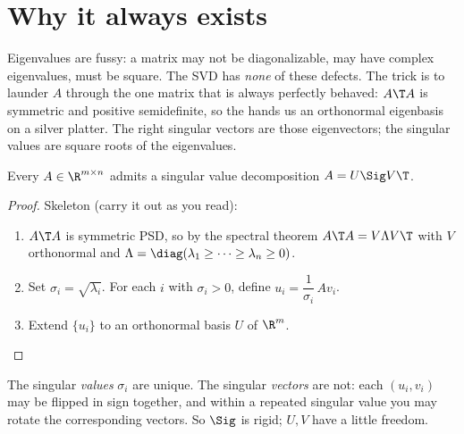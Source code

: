 \section{Why it always exists}\label{sec:existence}
\quad{}

\begin{strand}
Eigenvalues are fussy: a matrix may not be diagonalizable, may have complex eigenvalues, must
be square. The SVD has \emph{none} of these defects. The trick is to launder $A$ through the
one matrix that is always perfectly behaved: $A\T A$ is symmetric and positive semidefinite, so
the  hands us an orthonormal eigenbasis on a silver platter. The
right singular vectors are those eigenvectors; the singular values are square roots of the
eigenvalues.
\end{strand}


\begin{theorem}\label{thm:exist}
Every $A\in\R^{m\times n}$ admits a singular value decomposition $A=U\Sig V\T$.
\end{theorem}
\begin{proof}
Skeleton (carry it out as you read):
\begin{enumerate}[leftmargin=2em,itemsep=1pt]
  \item $A\T A$ is symmetric PSD, so by the spectral theorem $A\T A=V\Lambda V\T$ with $V$
        orthonormal and $\Lambda=\diag(\lambda_1\ge\cdots\ge\lambda_n\ge 0)$.
  \item Set $\sigma_i=\sqrt{\lambda_i}$. For each $i$ with $\sigma_i>0$, define
        $u_i=\dfrac{1}{\sigma_i}\,A v_i$. 
  \item Extend $\{u_i\}$ to an orthonormal basis $U$ of $\R^m$. 
\end{enumerate}
\end{proof}


\begin{remark}
The singular \emph{values} $\sigma_i$ are unique. The singular \emph{vectors} are not: each
$(u_i,v_i)$ may be flipped in sign together, and within a repeated singular value you may rotate
the corresponding vectors. So $\Sig$ is rigid; $U,V$ have a little freedom.
\end{remark}

